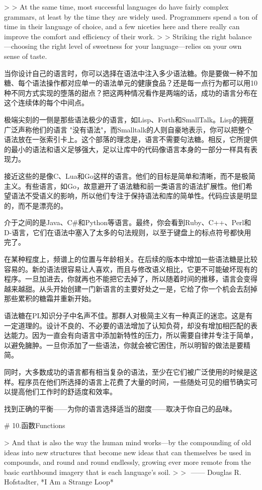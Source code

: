 \documentclass[cn,11pt,chinese]{elegantbook}
\begin{document}
{>
> At the same time, most successful languages do have fairly complex grammars, at least by the time they are widely used. Programmers spend a ton of time in their language of choice, and a few niceties here and there really can improve the comfort and efficiency of their work.
>
> Striking the right balance—choosing the right level of sweetness for your language—relies on your own sense of taste.

当你设计自己的语言时，你可以选择在语法中注入多少语法糖。你是要做一种不加糖、每个语法操作都对应单一的语法单元的健康食品？还是每一点行为都可以用10种不同方式实现的堕落的甜点？把这两种情况看作是两端的话，成功的语言分布在这个连续体的每个中间点。

极端尖刻的一侧是那些语法极少的语言，如Lisp、Forth和SmallTalk。Lisp的拥趸广泛声称他们的语言 "没有语法"，而Smalltalk的人则自豪地表示，你可以把整个语法放在一张索引卡上。这个部落的理念是，语言不需要句法糖。相反，它所提供的最小的语法和语义足够强大，足以让库中的代码像语言本身的一部分一样具有表现力。

接近这些的是像C、Lua和Go这样的语言。他们的目标是简单和清晰，而不是极简主义。有些语言，如Go，故意避开了语法糖和前一类语言的语法扩展性。他们希望语法不受语义的影响，所以他们专注于保持语法和库的简单性。代码应该是明显的，而不是漂亮的。

介于之间的是Java、C#和Python等语言。最终，你会看到Ruby、C++、Perl和D-语言，它们在语法中塞入了太多的句法规则，以至于键盘上的标点符号都快用完了。

在某种程度上，频谱上的位置与年龄相关。在后续的版本中增加一些语法糖是比较容易的。新的语法很容易让人喜欢，而且与修改语义相比，它更不可能破坏现有的程序。一旦加进去，你就再也不能把它去掉了，所以随着时间的推移，语言会变得越来越甜。从头开始创建一门新语言的主要好处之一是，它给了你一个机会去刮掉那些累积的糖霜并重新开始。

语法糖在PL知识分子中名声不佳。那群人对极简主义有一种真正的迷恋。这是有一定道理的。设计不良的、不必要的语法增加了认知负荷，却没有增加相匹配的表达能力。因为一直会有向语言中添加新特性的压力，所以需要自律并专注于简单，以避免臃肿。一旦你添加了一些语法，你就会被它困住，所以明智的做法是要精简。

同时，大多数成功的语言都有相当复杂的语法，至少在它们被广泛使用的时候是这样。程序员在他们所选择的语言上花费了大量的时间，一些随处可见的细节确实可以提高他们工作时的舒适度和效率。

找到正确的平衡——为你的语言选择适当的甜度——取决于你自己的品味。

# 10.函数Functions

> And that is also the way the human mind works—by the compounding of old ideas into new structures that become new ideas that can themselves be used in compounds, and round and round endlessly, growing ever more remote from the basic earthbound imagery that is each language’s soil.
>
> ​																														—— Douglas R. Hofstadter, *I Am a Strange Loop*

}
\end{document}
